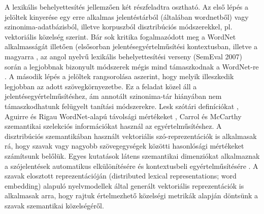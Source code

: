 \documentclass{llncs}
\begin{document}
A lexik\'{a}lis behelyettes\'{i}t\'{e}s jellemz\H{o}en k\'{e}t r\'{e}szfeladtra oszthat\'{o}. Az els\H{o} l\'{e}p\'{e}s a jel\"{o}ltek kinyer\'{e}se egy erre alkalmas jelent\'{e}st\'{a}rb\'{o}l (\'{a}ltal\'{a}ban wordnetb\H{o}l) vagy szinonima-adatb\'{a}zisb\'{o}l, illetve korpuszb\'{o}l disztrib\'{u}ci\'{o}s m\'{o}dszerekkel, pl. vektori\'{a}lis k\"{o}zels\'{e}g szerint. B\'{a}r sok kritika fogalmaz\'{o}dott meg a WordNet alkalmass\'{a}g\'{a}t illet\H{o}en (els\H{o}sorban jelent\'{e}segy\'{e}rtelm\H{u}s\'{i}t\'{e}si kontextusban, \cite{veronis03,idewilks06} illetve a magyarra \cite{heja09}, az angol nyelv\H{u} lexik\'{a}lis behelyettes\'{i}t\'{e}si verseny (SemEval 2007) sor\'{a}n a legjobbnak bizonyult m\'{o}dszerek m\'{e}gis mind t\'{a}maszkodnak a WordNet-re \cite{UNTSemeval,MELBSemeval}. A m\'{a}sodik l\'{e}p\'{e}s a jel\"{o}ltek rangsorol\'{a}sa aszerint, hogy melyik illeszkedik legjobban az adott sz\"{o}vegk\"{o}rnyezetbe. Ez a feladat k\"{o}zel \'{a}ll a jelent\'{e}segy\'{e}rtelm\H{u}s\'{i}t\'{e}shez, \'{a}m annot\'{a}lt szinonima-t\'{a}r hi\'{a}ny\'{a}ban nem t\'{a}maszkodhatunk fel\"{u}gyelt tan\'{i}t\'{a}si m\'{o}dszerekre. Lesk sz\'{o}t\'{a}ri defin\'{i}ci\'{o}kat \cite{lesk86}, Aguirre \'{e}s Rigau WordNet-alap\'{u} t\'{a}vols\'{a}gi m\'{e}rt\'{e}keket \cite{aguirrerigau96}, Carrol \'{e}s McCarthy szemantikai szelekci\'{o}s inform\'{a}ci\'{o}kat \cite{carroll00} haszn\'{a}l az egy\'{e}rtelm\H{u}s\'{i}t\'{e}shez. A disztrib\'{u}ci\'{o}s szemantik\'{a}ban haszn\'{a}lt vektori\'{a}lis sz\'{o}-reprezent\'{a}ci\'{o}k is alkalmasak r\'{a}, hogy szavak vagy nagyobb sz\"{o}vegegys\'{e}gek k\"{o}z\"{o}tti hasonl\'{o}s\'{a}gi m\'{e}rt\'{e}keket sz\'{a}m\'{i}tsunk bel\H{o}l\"{u}k. Egyes kutat\'{a}sok l\'{a}tens szemantikai dimenzi\'{o}kat alkalmaznak a sz\'{o}jelent\'{e}sek automatikus elk\"{u}l\"{o}n\'{i}t\'{e}s\'{e}re \'{e}s kontextusbeli egy\'{e}rtelm\H{u}s\'{i}t\'{e}s\'{e}re \cite{linpantel,vandecruys}. A szavak elosztott reprezent\'{a}ci\'{o}j\'{a}n (distributed lexical representations; word embedding) alapul\'{o} nyelvmodellek \cite{mikolov13} \'{a}ltal gener\'{a}lt vektori\'{a}lis reprezent\'{a}ci\'{o}k is alkalmasak arra, hogy rajtuk \'{e}rtelmezhet\H{o} k\"{o}zels\'{e}gi metrik\'{a}k alapj\'{a}n d\"{o}nts\"{u}nk a szavak szemantikai k\"{o}zels\'{e}g\'{e}r\H{o}l.
\end{document}
